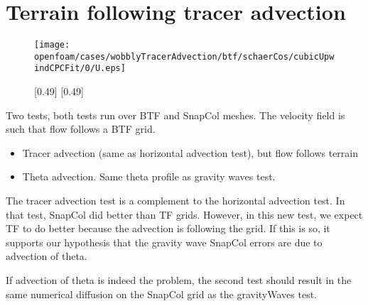 \section{Terrain following tracer advection}

\begin{figure}
	\centering
	\texttt{[image: openfoam/cases/wobblyTracerAdvection/btf/schaerCos/cubicUpwindCPCFit/0/U.eps]}
	\caption{}
	\label{fig:wobblyTracer:u}
\end{figure}

\begin{figure}
	\captionsetup[subfigure]{position=b}
	\centering
	[0.49\textwidth]{}
	\hfill
	[0.49\textwidth]{}
%
	\caption{}
\end{figure}


Two tests, both tests run over BTF and SnapCol meshes.  The velocity field is such that flow follows a BTF grid.
\begin{itemize}
\item Tracer advection (same as horizontal advection test), but flow follows terrain
\item Theta advection.  Same theta profile as gravity waves test.  
\end{itemize}

The tracer advection test is a complement to the horizontal advection test.  In that test, SnapCol did better than TF grids.  However, in this new test, we expect TF to do better because the advection is following the grid.  If this is so, it supports our hypothesis that the gravity wave SnapCol errors are due to advection of theta.

If advection of theta is indeed the problem, the second test should result in the same numerical diffusion on the SnapCol grid as the gravityWaves test.

